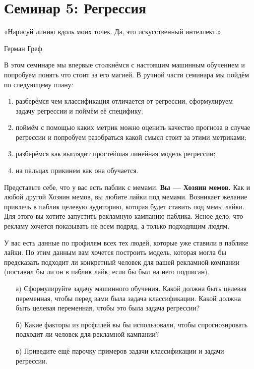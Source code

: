 \documentclass[12pt, a4paper, oneside]{article}
\theoremstyle{plain} %
\theoremstyle{definition}
\newcounter{problem}%
\renewcommand{\theproblem}{\arabic{problem}}
\newenvironment{problem}[1]{
\addtocounter{problem}{1}\noindent{ \color{titleblue} \large \bfseries Упражнение~\theproblem~#1 \vspace{1ex} \newline}
}{ }
\newcommand{\indef}[1]{\textbf{ \color{green} #1}}
\begin{document}

\toggletrue{lecture}

\section*{Семинар 5: Регрессия}

\epigraph{«Нарисуй линию вдоль моих точек. Да, это искусственный интеллект.»}{Герман Греф}


В этом семинаре мы впервые столкнёмся с настоящим машинным обучением и попробуем понять что стоит за его магией. В ручной части семинара мы пойдём по следующему  плану: 

\begin{enumerate}
\item разберёмся чем классификация отличается от регрессии, сформулируем задачу регрессии и поймём её специфику;
\item поймём с помощью каких метрик можно оценить качество прогноза в случае регрессии и попробуем разобраться какой смысл стоит за этими метриками;
\item разберёмся как выглядит простейшая линейная модель регрессии;
\item на пальцах прикинем как она обучается.
\end{enumerate}

\begin{problem}{(ставим задачу)}
Представьте себе, что у вас есть паблик с мемами. \indef{Вы --- Хозяин мемов.} Как и любой другой Хозяин мемов, вы любите лайки под мемами. Возникает желание привлечь в паблик целевую аудиторию, которая будет ставить под мемы лайки. Для этого вы хотите запустить рекламную кампанию паблика. Ясное дело, что рекламу хочется показывать не всем подряд,  а только подходящим людям. 

У вас есть данные по профилям всех тех людей, которые уже ставили в паблике лайки. По этим данным вам хочется построить модель, которая могла бы предсказать подходит ли конкретный человек для вашей рекламной компании (поставил бы ли он в паблик лайк, если бы был на него подписан). 

\begin{enumerate}
\item[а)] Сформулируйте задачу машинного обучения. Какой должна быть целевая переменная, чтобы перед вами была задача классификации. Какой должна быть целевая переменная, чтобы это была задача регрессии? 

\item[б)] Какие факторы из профилей вы бы использовали, чтобы спрогнозировать подходит ли человек для рекламной кампании?

\item[в)] Приведите ещё парочку примеров задачи классификации и задачи регрессии. 
\end{enumerate}
\end{problem}
\end{document}
